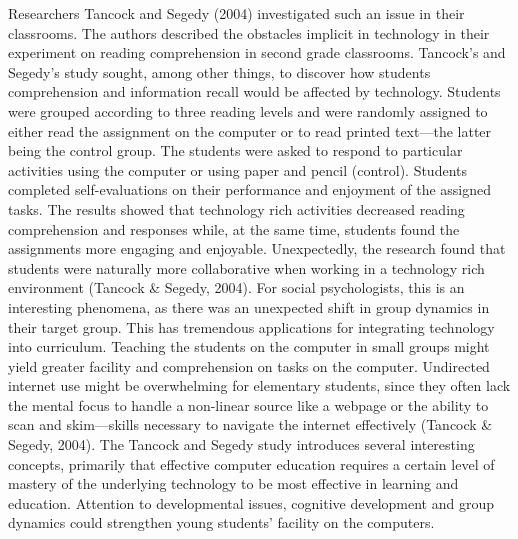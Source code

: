 Researchers Tancock and Segedy (2004) investigated such an issue in their classrooms. The authors described the obstacles implicit in technology in their experiment on reading comprehension in second grade classrooms.  Tancock’s and Segedy’s study sought, among other things, to discover how students comprehension and information recall would be affected by technology. Students were grouped according to three reading levels and were randomly assigned to either read the assignment on the computer or to read printed text—the latter being the control group. The students were asked to respond to particular activities using the computer or using paper and pencil (control).  Students completed self-evaluations on their performance and enjoyment of the assigned tasks.  The results showed that technology rich activities decreased reading comprehension and responses while, at the same time, students found the assignments more engaging and enjoyable.  Unexpectedly, the research found that students were naturally more collaborative when working in a technology rich environment (Tancock \& Segedy, 2004).  For social psychologists, this is an interesting phenomena, as there was an unexpected shift in group dynamics in their target group. This has tremendous applications for integrating technology into curriculum. Teaching the students on the computer in small groups might yield greater facility and comprehension on tasks on the computer.  Undirected internet use might be overwhelming for elementary students, since they often lack the mental focus to handle a non-linear source like a webpage or the ability to scan and skim—skills necessary to navigate the internet effectively (Tancock \& Segedy, 2004). The Tancock and Segedy study introduces several interesting concepts, primarily that effective computer education requires a certain level of mastery of the underlying technology to be most effective in learning and education. Attention to developmental issues, cognitive development and group dynamics could strengthen young students’ facility on the computers.  
